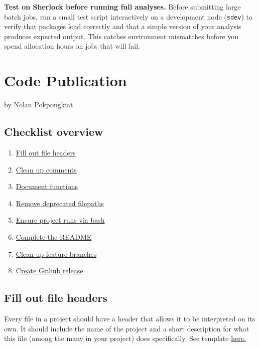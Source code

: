 \documentclass[
]{book}
\providecommand{\tightlist}{%
  \setlength{\itemsep}{0pt}\setlength{\parskip}{0pt}}
\begin{document}
\textbf{Test on Sherlock before running full analyses.} Before submitting large batch jobs, run a small test script interactively on a development node (\texttt{sdev}) to verify that packages load correctly and that a simple version of your analysis produces expected output. This catches environment mismatches before you spend allocation hours on jobs that will fail.

\chapter{Code Publication}\label{code-publication}

by Nolan Pokpongkiat

\section{Checklist overview}\label{checklist-overview}

\begin{enumerate}
\def\labelenumi{\arabic{enumi}.}
\tightlist
\item
  \hyperref[fill-out-file-headers]{Fill out file headers}
\item
  \hyperref[clean-up-comments]{Clean up comments}
\item
  \hyperref[document-functions]{Document functions}
\item
  \hyperref[remove-deprecated-filepaths]{Remove deprecated filepaths}
\item
  \hyperref[ensure-project-runs-via-bash]{Ensure project runs via bash}
\item
  \hyperref[complete-the-readme]{Complete the README}
\item
  \hyperref[clean-up-feature-branches]{Clean up feature branches}
\item
  \hyperref[create-github-release]{Create Github release}
\end{enumerate}

\section{Fill out file headers}\label{fill-out-file-headers}

Every file in a project should have a header that allows it to be interpreted on its own. It should include the name of the project and a short description for what this file (among the many in your project) does specifically. See template \href{https://jadebc.github.io/lab-manual/coding-practices.html\#file-headers}{here.}
\end{document}
